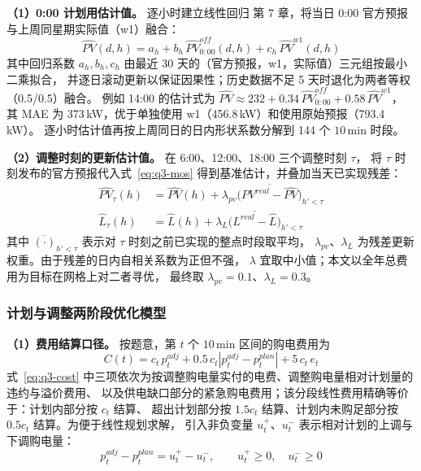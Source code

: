 \textbf{（1）0:00 计划用估计值。} 逐小时建立线性回归\cite{fpp3} 第 7 章，将当日 0:00 官方预报与上周同星期实际值（w1）融合：
\begin{equation}
\widehat{PV}(d,h)=a_h+b_h\,\widehat{PV}^{off}_{0:00}(d,h)+c_h\,\widehat{PV}^{w1}(d,h)
\label{eq:q3-mos}
\end{equation}
其中回归系数 $a_h,b_h,c_h$ 由最近 30 天的（官方预报，w1，实际值）三元组按最小二乘拟合，
并逐日滚动更新以保证因果性；历史数据不足 5 天时退化为两者等权（0.5/0.5）融合。
例如 14:00 的估计式为 $\widehat{PV}\approx 232+0.34\,\widehat{PV}^{off}_{0:00}+0.58\,\widehat{PV}^{w1}$，
其 MAE 为 373\,kW，优于单独使用 w1（456.8\,kW）和使用原始预报（793.4\,kW）。
逐小时估计值再按上周同日的日内形状系数分解到 144 个 $10\,$min 时段。

\textbf{（2）调整时刻的更新估计值。} 在 6:00、12:00、18:00 三个调整时刻 $\tau$，
将 $\tau$ 时刻发布的官方预报代入式~\ref{eq:q3-mos} 得到基准估计，并叠加当天已实现残差：
\begin{equation}
\begin{aligned}
\widehat{PV}_\tau(h)&=\widehat{PV}(h)+\lambda_{pv}\overline{\Big(PV^{real}-\widehat{PV}\Big)}_{h'<\tau}\\
\widehat{L}_\tau(h)&=\widehat{L}(h)+\lambda_L\overline{\Big(L^{real}-\widehat{L}\Big)}_{h'<\tau}
\end{aligned}
\label{eq:q3-resid}
\end{equation}
其中 $\overline{(\cdot)}_{h'<\tau}$ 表示对 $\tau$ 时刻之前已实现的整点时段取平均，
$\lambda_{pv}$、$\lambda_L$ 为残差更新权重。由于残差的日内自相关系数为正但不强，
$\lambda$ 宜取中小值；本文以全年总费用为目标在网格上对二者寻优，
最终取 $\lambda_{pv}=0.1$、$\lambda_L=0.3$。

\subsubsection{计划与调整两阶段优化模型}
\textbf{（1）费用结算口径。} 按题意，第 $t$ 个 $10\,$min 区间的购电费用为
\begin{equation}
C(t)=c_t\,p^{adj}_t+0.5\,c_t\left|p^{adj}_t-p^{plan}_t\right|+5\,c_t\,e_t
\label{eq:q3-cost}
\end{equation}
式~\ref{eq:q3-cost} 中三项依次为按调整购电量实付的电费、调整购电量相对计划量的违约与溢价费用、
以及供电缺口部分的紧急购电费用；该分段线性费用精确等价于：计划内部分按 $c_t$ 结算、
超出计划部分按 $1.5c_t$ 结算、计划内未购足部分按 $0.5c_t$ 结算。为便于线性规划求解，
引入非负变量 $u^{+}_t$、$u^{-}_t$ 表示相对计划的上调与下调购电量：
\begin{equation}
p^{adj}_t-p^{plan}_t=u^{+}_t-u^{-}_t,\qquad u^{+}_t\ge 0,\quad u^{-}_t\ge 0
\label{eq:q3-split}
\end{equation}

